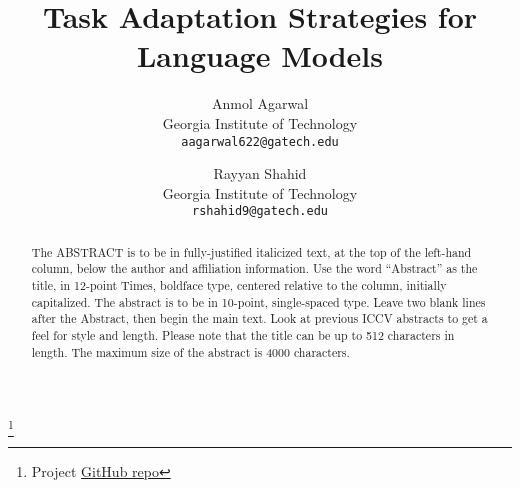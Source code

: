 \documentclass[10pt,twocolumn,letterpaper]{article}
\begin{document}
\title{Task Adaptation Strategies for Language Models}

\author{Anmol Agarwal\\
	Georgia Institute of Technology\\
	{\tt\small aagarwal622@gatech.edu}
	\and
	Rayyan Shahid\\
	Georgia Institute of Technology\\
	{\tt\small rshahid9@gatech.edu}
}

\maketitle




\begin{abstract}
	The ABSTRACT is to be in fully-justified italicized text, at the top
	of the left-hand column, below the author and affiliation
	information. Use the word ``Abstract'' as the title, in 12-point
	Times, boldface type, centered relative to the column, initially
	capitalized. The abstract is to be in 10-point, single-spaced type.
	Leave two blank lines after the Abstract, then begin the main text.
	Look at previous ICCV abstracts to get a feel for style and length.
	Please note that the title can be up to 512 characters in length.
	The maximum size of the abstract is 4000 characters.
\end{abstract}

\footnote{Project \href{https://github.com/sicario001/llmft}{GitHub repo}}
\end{document}
